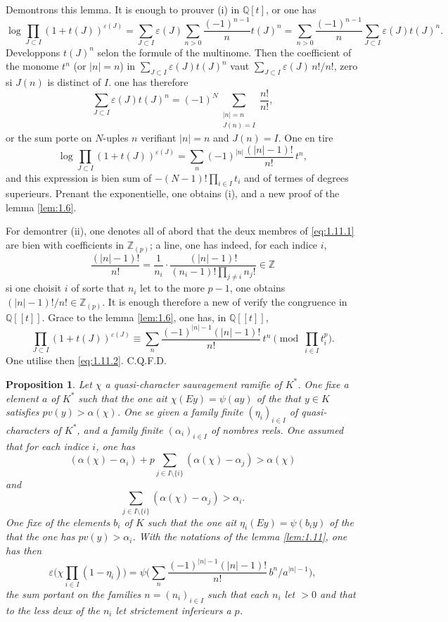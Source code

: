 \documentclass[12pt,a4paper]{article}
\theoremstyle{plain}
\newtheorem{proposition}[theorem]{Proposition}
\theoremstyle{definition}
\theoremstyle{remark}
\newcommand{\bQ}{\mathbb{Q}}
\newcommand{\bZ}{\mathbb{Z}}
\begin{document}
Demontrons this lemma. It is enough to prouver (i) in $\bQ[t]$, or one has
\[
\log \prod_{J \subset I}(1+t(J))^{\varepsilon(J)} = \sum_{J \subset I} \varepsilon(J) \sum_{n>0} \frac{(-1)^{n-1}}{n} t(J)^n = \sum_{n>0} \frac{(-1)^{n-1}}{n} \sum_{J \subset I} \varepsilon(J) t(J)^n.
\]
Developpons $t(J)^n$ selon the formule of the multinome. Then the coefficient of the monome $t^n$ (or $|n| = n$) in $\sum_{J \subset I} \varepsilon(J) t(J)^n$ vaut $\sum_{J \subset I} \varepsilon(J) \, n!/n!$, zero si $J(n)$ is distinct of $I$.
one has therefore
\[
\sum_{J \subset I} \varepsilon(J) t(J)^n = (-1)^N \sum_{\substack{|n|=n \\ J(n)=I}} \frac{n!}{n!},
\]
or the sum porte on $N$-uples $n$ verifiant $|n| = n$ and $J(n) = I$. One en tire
\begin{equation}\label{eq:1.11.2}
\log \prod_{J \subset I}(1+t(J))^{\varepsilon(J)} = \sum_n (-1)^{|n|} \frac{(|n|-1)!}{n!} \, t^n,
\end{equation}
and this expression is bien sum of $-(N-1)! \prod_{i \in I} t_i$ and of termes of degrees superieurs. Prenant the exponentielle, one obtains (i), and a new proof of the lemma \ref{lem:1.6}.

For demontrer (ii), one denotes all of abord that the deux membres of \eqref{eq:1.11.1} are bien with coefficients in $\bZ_{(p)}$; a line, one has indeed, for each indice $i$,
\[
\frac{(|n|-1)!}{n!} = \frac{1}{n_i} \cdot \frac{(|n|-1)!}{(n_i-1)! \prod_{j \neq i} n_j!} \in \bZ
\]
si one choisit $i$ of sorte that $n_i$ let to the more $p-1$, one obtains $(|n|-1)!/n! \in \bZ_{(p)}$. It is enough therefore a new of verify the congruence in $\bQ[[t]]$. Grace to the lemma \ref{lem:1.6}, one has, in $\bQ[[t]]$,
\[
\prod_{J \subset I}(1+t(J))^{\varepsilon(J)} \equiv \sum_n \frac{(-1)^{|n|-1}(|n|-1)!}{n!} \, t^n \pmod{\prod_{i \in I} t_i^p}.
\]
One utilise then \eqref{eq:1.11.2}. C.Q.F.D.

\begin{proposition}\label{prop:1.11}
Let $\chi$ a quasi-character sauvagement ramifie of $K^*$. One fixe a element $a$ of $K^*$ such that the one ait $\chi(Ey) = \psi(ay)$ of the that $y \in K$ satisfies $pv(y) > \alpha(\chi)$. One se given a family finite $(\eta_i)_{i \in I}$ of quasi-characters of $K^*$, and a family finite $(\alpha_i)_{i \in I}$ of nombres reels. One assumed that for each indice $i$, one has
\[
(\alpha(\chi) - \alpha_i) + p \sum_{j \in I \setminus \{i\}} (\alpha(\chi) - \alpha_j) > \alpha(\chi)
\]
and
\[
\sum_{j \in I \setminus \{i\}} (\alpha(\chi) - \alpha_j) > \alpha_i.
\]
One fixe of the elements $b_i$ of $K$ such that the one ait $\eta_i(Ey) = \psi(b_i y)$ of the that the one has $pv(y) > \alpha_i$. With the notations of the lemma \ref{lem:1.11}, one has then
\begin{equation}\label{eq:1.11.3}
\varepsilon\biggl(\chi \prod_{i \in I}(1-\eta_i)\biggr) = \psi\biggl(\sum_n \frac{(-1)^{|n|-1}(|n|-1)!}{n!} \, b^n/a^{|n|-1}\biggr),
\end{equation}
the sum portant on the families $n = (n_i)_{i \in I}$ such that each $n_i$ let $> 0$ and that to the less deux of the $n_i$ let strictement inferieurs a $p$.
\end{proposition}
\end{document}
